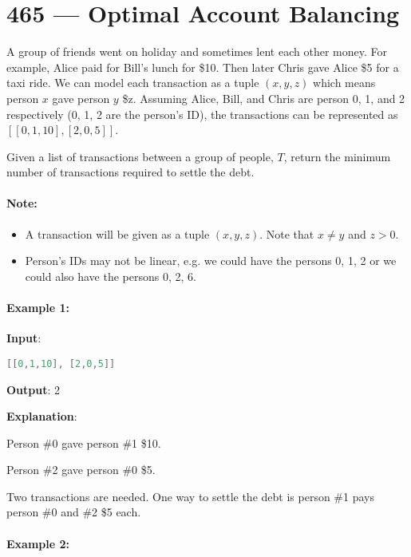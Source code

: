 \section{465 --- Optimal Account Balancing}
A group of friends went on holiday and sometimes lent each other money. For example, Alice paid for Bill's lunch for \$10. Then later Chris gave Alice \$5 for a taxi ride. We can model each transaction as a tuple $(x, y, z)$ which means person $x$ gave person $y$ \$z. Assuming Alice, Bill, and Chris are person 0, 1, and 2 respectively (0, 1, 2 are the person's ID), the transactions can be represented as $ [[0, 1, 10], [2, 0, 5]] $.

Given a list of transactions between a group of people, $T$, return the minimum number of transactions required to settle the debt.

\paragraph{Note:}

\begin{itemize}
\item A transaction will be given as a tuple $ (x, y, z) $. Note that $x \neq y$ and $z > 0$.

\item Person's IDs may not be linear, e.g. we could have the persons 0, 1, 2 or we could also have the persons 0, 2, 6.
\end{itemize}

\paragraph{Example 1:}

\begin{flushleft}
\textbf{Input}:

\lstinline[language=C++, basicstyle=\small\ttfamily, keywordstyle=\bfseries\color{green!40!black}]|[[0,1,10], [2,0,5]]|

\textbf{Output}: 2

\textbf{Explanation}:

Person \#0 gave person \#1 \$10.

Person \#2 gave person \#0 \$5.


Two transactions are needed. One way to settle the debt is person \#1 pays person \#0 and \#2 \$5 each.
\end{flushleft}


\paragraph{Example 2:}

